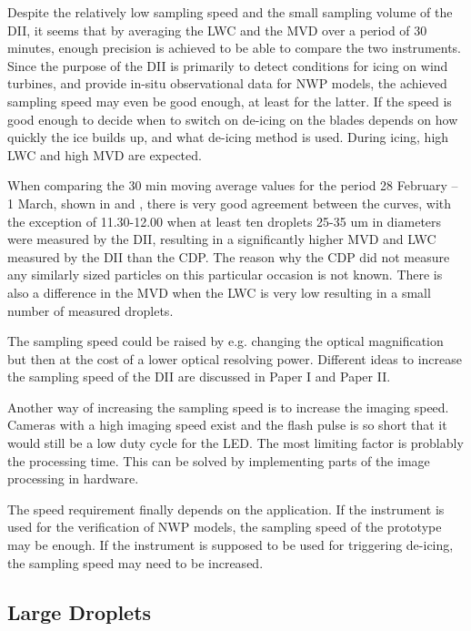 Despite the relatively low sampling speed and the small sampling volume of the DII, it seems that by averaging the LWC and the MVD over a period of 30 minutes, enough precision is achieved to be able to compare the two instruments. Since the purpose of the DII is primarily to detect conditions for icing on wind turbines, and provide in-situ observational data for NWP models, the achieved sampling speed may even be good enough, at least for the latter. If the speed is good enough to decide when to switch on de-icing on the blades depends on how quickly the ice builds up, and what de-icing method is used. During icing, high LWC and high MVD are expected.

When comparing the 30 min moving average values for the period 28 February -- 1 March, shown in  and , there is very good agreement between the curves, with the exception of 11.30-12.00 when at least ten droplets 25-35 um in diameters were measured by the DII, resulting in a significantly higher MVD and LWC measured by the DII than the CDP. The reason why the CDP did not measure any similarly sized particles on this particular occasion is not known. There is also a difference in the MVD when the LWC is very low resulting in a small number of measured droplets.

The sampling speed could be raised by e.g. changing the optical magnification but then at the cost of a lower optical resolving power. Different ideas to increase the sampling speed of the DII are discussed in Paper I and Paper II.

Another way of increasing the sampling speed is to increase the imaging speed. Cameras with a high imaging speed exist and the flash pulse is so short that it would still be a low duty cycle for the LED. The most limiting factor is problably the processing time. This can be solved by implementing parts of the image processing in hardware.

The speed requirement finally depends on the application. If the instrument is used for the verification of NWP models, the sampling speed of the prototype may be enough. If the instrument is supposed to be used for triggering de-icing, the sampling speed may need to be increased.

\subsection{Large Droplets}


